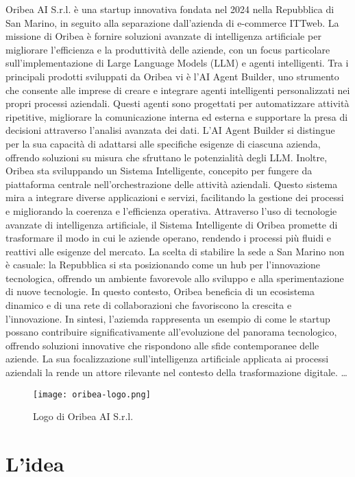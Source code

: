 Oribea AI S.r.l. è una startup innovativa fondata nel 2024 nella Repubblica di San Marino, in seguito alla separazione dall'azienda di e-commerce ITTweb. La missione di Oribea è fornire soluzioni avanzate di intelligenza artificiale per migliorare l'efficienza e la produttività delle aziende, con un focus particolare sull'implementazione di Large Language Models (LLM) e agenti intelligenti.
Tra i principali prodotti sviluppati da Oribea vi è l'AI Agent Builder, uno strumento che consente alle imprese di creare e integrare agenti intelligenti personalizzati nei propri processi aziendali. Questi agenti sono progettati per automatizzare attività ripetitive, migliorare la comunicazione interna ed esterna e supportare la presa di decisioni attraverso l'analisi avanzata dei dati. L'AI Agent Builder si distingue per la sua capacità di adattarsi alle specifiche esigenze di ciascuna azienda, offrendo soluzioni su misura che sfruttano le potenzialità degli LLM.
Inoltre, Oribea sta sviluppando un Sistema Intelligente, concepito per fungere da piattaforma centrale nell'orchestrazione delle attività aziendali. Questo sistema mira a integrare diverse applicazioni e servizi, facilitando la gestione dei processi e migliorando la coerenza e l'efficienza operativa. Attraverso l'uso di tecnologie avanzate di intelligenza artificiale, il Sistema Intelligente di Oribea promette di trasformare il modo in cui le aziende operano, rendendo i processi più fluidi e reattivi alle esigenze del mercato.
La scelta di stabilire la sede a San Marino non è casuale: la Repubblica si sta posizionando come un hub per l'innovazione tecnologica, offrendo un ambiente favorevole allo sviluppo e alla sperimentazione di nuove tecnologie. In questo contesto, Oribea beneficia di un ecosistema dinamico e di una rete di collaborazioni che favoriscono la crescita e l'innovazione.
In sintesi, l'aziemda rappresenta un esempio di come le startup possano contribuire significativamente all'evoluzione del panorama tecnologico, offrendo soluzioni innovative che rispondono alle sfide contemporanee delle aziende. La sua focalizzazione sull'intelligenza artificiale applicata ai processi aziendali la rende un attore rilevante nel contesto della trasformazione digitale.
\dots

\begin{figure}
    \centering
    \texttt{[image: oribea-logo.png]}
    \caption{Logo di Oribea AI S.r.l.}
    \label{fig:oribea-logo}
\end{figure}

\section{L'idea}

